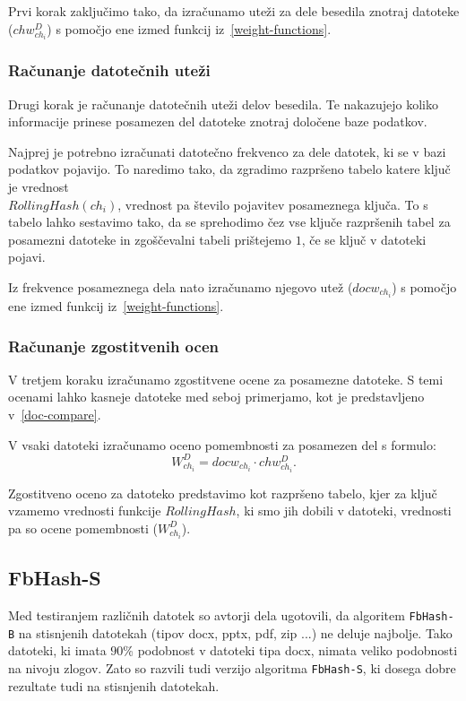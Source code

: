 \documentclass{acm_proc_article-sp}
\begin{document}
Prvi korak zaključimo tako, da izračunamo uteži za dele besedila znotraj datoteke ($chw_{ch_i}^D$) s pomočjo ene izmed funkcij iz~\ref{weight-functions}. 

\subsubsection{Računanje datotečnih uteži}

Drugi korak je računanje datotečnih uteži delov besedila. Te nakazujejo koliko informacije prinese posamezen del datoteke znotraj določene baze podatkov. 

Najprej je potrebno izračunati datotečno frekvenco za dele datotek, ki se v bazi podatkov pojavijo. To naredimo tako, da zgradimo razpršeno tabelo katere ključ je vrednost \\ $RollingHash(ch_i)$, vrednost pa število pojavitev posameznega ključa. To s tabelo lahko sestavimo tako, da se sprehodimo čez vse ključe razpršenih tabel za posamezni datoteke in zgoščevalni tabeli prištejemo $1$, če se ključ v datoteki pojavi.

Iz frekvence posameznega dela nato izračunamo njegovo utež ($docw_{ch_i}$) s pomočjo ene izmed funkcij iz~\ref{weight-functions}.

\subsubsection{Računanje zgostitvenih ocen}

V tretjem koraku izračunamo zgostitvene ocene za posamezne datoteke. S temi ocenami lahko kasneje datoteke med seboj primerjamo, kot je predstavljeno v~\ref{doc-compare}.

V vsaki datoteki izračunamo oceno pomembnosti za posamezen del s formulo: \begin{displaymath}  W_{ch_i}^D = docw_{ch_i} \cdot chw_{ch_i}^D. \end{displaymath}

Zgostitveno oceno za datoteko predstavimo kot razpršeno tabelo, kjer za ključ vzamemo vrednosti funkcije $RollingHash$, ki smo jih dobili v datoteki, vrednosti pa so ocene pomembnosti ($W_{ch_i}^D$).

\subsection{FbHash-S}

Med testiranjem različnih datotek so avtorji dela ugotovili, da algoritem \texttt{FbHash-B} na stisnjenih datotekah (tipov docx, pptx, pdf, zip ...) ne deluje najbolje. Tako datoteki, ki imata $90$\% podobnost v datoteki tipa docx, nimata veliko podobnosti na nivoju zlogov. Zato so razvili tudi verzijo algoritma \texttt{FbHash-S}, ki dosega dobre rezultate tudi na stisnjenih datotekah.
\end{document}
